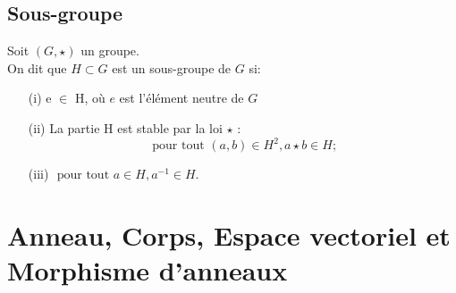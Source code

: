 \subsection{Sous-groupe}
\begin{madefinition}
	Soit $(G, \star)$ un groupe. \\
	On dit que $H \subset G$ est un sous-groupe de $G$ si:
	\begin{enumerate}
		\item[(i)] e $\in$ H, où $e$ est l'élément neutre de $G$
		\item[(ii)] La partie H est stable par la loi $\star$ :
		\[\text{ pour tout } (a,b) \in H^2, a \star b \in H;\]
		\item[(iii)] $\text{ pour tout } a \in H, a^{-1} \in H$.
	\end{enumerate}
\end{madefinition}

\section{Anneau, Corps, Espace vectoriel et Morphisme d'anneaux}
